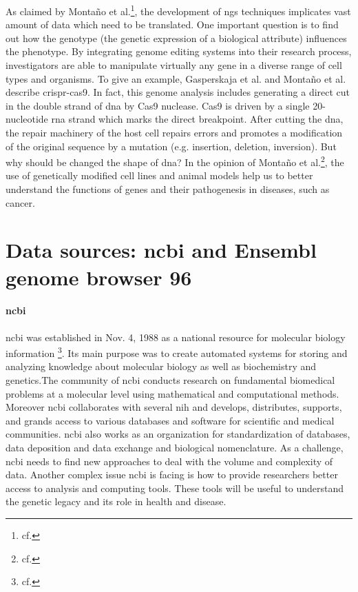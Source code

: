 As claimed by Monta\~{n}o et al.\footnote{cf.\autocite{montano_2018}}, the development of \gls{ngs} techniques implicates vast amount of data which need to be translated. One important question is to find out how the genotype (the genetic expression of a biological attribute) influences the phenotype. By integrating genome editing systems into their research process, investigators are able to manipulate virtually any gene in a diverse range of cell types and organisms.
To give an example, Gasperskaja et al. and Monta\~{n}o et al. describe \gls{crispr-cas9}. In fact, this genome analysis includes generating a direct cut in the double strand of \gls{dna} by Cas9 nuclease. Cas9 is driven by a single 20-nucleotide \gls{rna} strand which marks the direct breakpoint. After cutting the \gls{dna}, the repair machinery of the host cell repairs errors and promotes a modification of the original sequence by a mutation (e.g. insertion, deletion, inversion).
But why should be changed the shape of \gls{dna}? In the opinion of Monta\~{n}o et al.\footnote{cf.\autocite{montano_2018}}, the use of genetically modified cell lines and animal models help us to better understand the functions of genes and their pathogenesis in diseases, such as cancer.
   
\section{Data sources: \gls{ncbi} and Ensembl genome browser 96}\label{datasources}

\paragraph{\gls{ncbi}}

\gls{ncbi} was established in Nov. 4, 1988 as a national resource for molecular biology information \footnote{cf.\autocite{ncbi}}. Its main purpose was to create automated systems for storing and analyzing knowledge about molecular biology as well as biochemistry and genetics.The community of \gls{ncbi} conducts research on fundamental biomedical problems at a molecular level using mathematical and computational methods.
Moreover \gls{ncbi} collaborates with several \gls{nih} and develops, distributes, supports, and grands access to various databases and software for scientific and medical communities.
\gls{ncbi} also works as an organization for standardization of databases, data deposition and data exchange and biological nomenclature.
As a challenge, \gls{ncbi} needs to find new approaches to deal with the volume and complexity of data. Another complex issue \gls{ncbi} is facing is how to provide researchers better access to analysis and computing tools. These tools will be useful to understand the genetic legacy and its role in health and disease.

